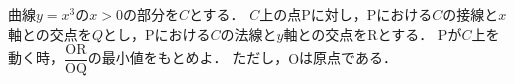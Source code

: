 曲線$y=x^3$の$x>0$の部分を$C$とする．
$C$上の点$\mathrm{P}$に対し，$\mathrm{P}$における$C$の接線と$x$軸との交点を$Q$とし，$\mathrm{P}$における$C$の法線と$y$軸との交点を$\mathrm{R}$とする．
$\mathrm{P}$が$C$上を動く時，$\dfrac{\mathrm{OR}}{\mathrm{OQ}}$の最小値をもとめよ．
ただし，$\mathrm{O}$は原点である．
